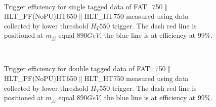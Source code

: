 \begin{figure}[htb]
\centering
       \\
\caption[Trigger efficiencies]{Trigger efficiency for single tagged data of FAT\_750$\parallel$HLT\_PF(NoPU)HT650$\parallel$HLT\_HT750 measured using data collected by lower threshold $H_T550$ trigger. The dash red line is positioned at $m_{jj}$ equal $890 GeV$, the blue line is at efficiency at 99$\%$. }
  \label{fig:trigger efficiencies part2}
\end{figure}

\begin{figure}[htb]
\centering
      \\
\caption[Trigger efficiencies]{Trigger efficiency for double tagged data of FAT\_750$\parallel$HLT\_PF(NoPU)HT650$\parallel$HLT\_HT750 measured using data collected by lower threshold $H_T550$ trigger. The dash red line is positioned at $m_{jj}$ equal $890 GeV$, the blue line is at efficiency at 99$\%$. }
  \label{fig:trigger efficiencies part3}
\end{figure}


\clearpage













